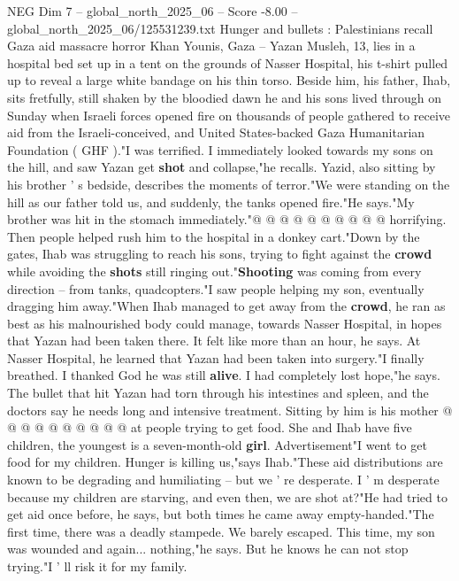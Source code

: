 \begin{textsample}{NEG Dim 7 – global\_north\_2025\_06 – Score -8.00 – global\_north\_2025\_06/125531239.txt}  \label{ex:f7_neg_076}
Hunger and bullets : Palestinians recall Gaza aid massacre horror Khan Younis, Gaza -- Yazan Musleh, 13, lies in a hospital bed set up in a tent on the grounds of Nasser Hospital, his t-shirt pulled up to reveal a large white bandage on his thin torso.
Beside him, his father, Ihab, sits fretfully, still shaken by the bloodied dawn he and his sons lived through on Sunday when Israeli forces opened fire on thousands of people gathered to receive aid from the Israeli-conceived, and United States-backed Gaza Humanitarian Foundation ( GHF )."I was terrified.
I immediately looked towards my sons on the hill, and saw Yazan get \textbf{shot} and collapse,"he recalls.
Yazid, also sitting by his brother ' s bedside, describes the moments of terror."We were standing on the hill as our father told us, and suddenly, the tanks opened fire."He says."My brother was hit in the stomach immediately."@ @ @ @ @ @ @ @ @ @ horrifying.
Then people helped rush him to the hospital in a donkey cart."Down by the gates, Ihab was struggling to reach his sons, trying to fight against the \textbf{crowd} while avoiding the \textbf{shots} still ringing out."\textbf{Shooting} was coming from every direction -- from tanks, quadcopters."I saw people helping my son, eventually dragging him away."When Ihab managed to get away from the \textbf{crowd}, he ran as best as his malnourished body could manage, towards Nasser Hospital, in hopes that Yazan had been taken there.
It felt like more than an hour, he says.
At Nasser Hospital, he learned that Yazan had been taken into surgery."I finally breathed.
I thanked God he was still \textbf{alive}.
I had completely lost hope,"he says.
The bullet that hit Yazan had torn through his intestines and spleen, and the doctors say he needs long and intensive treatment.
Sitting by him is his mother @ @ @ @ @ @ @ @ @ @ at people trying to get food.
She and Ihab have five children, the youngest is a seven-month-old \textbf{girl}.
Advertisement"I went to get food for my children.
Hunger is killing us,"says Ihab."These aid distributions are known to be degrading and humiliating -- but we ' re desperate.
I ' m desperate because my children are starving, and even then, we are shot at?"He had tried to get aid once before, he says, but both times he came away empty-handed."The first time, there was a deadly stampede.
We barely escaped.
This time, my son was wounded and again... nothing,"he says.
But he knows he can not stop trying."I ' ll risk it for my family.

\end{textsample}
